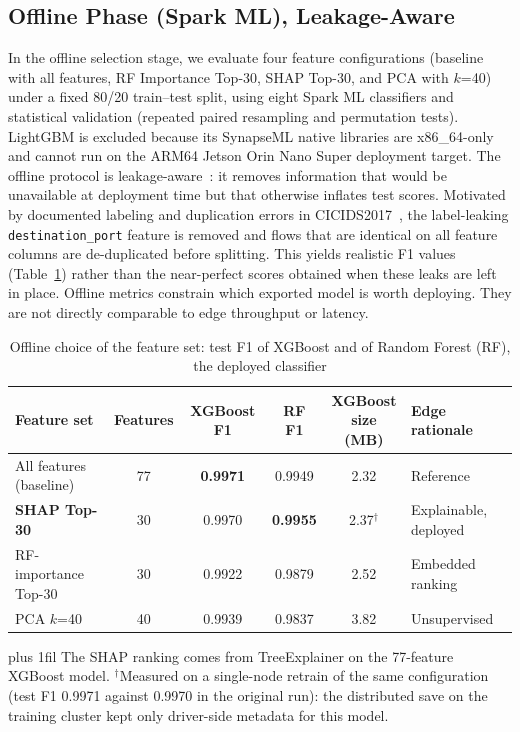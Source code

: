 \documentclass[runningheads]{llncs}
\newcommand{\tabnote}[1]{%
  \vspace{4pt}\par\noindent
  \begin{minipage}{\textwidth}%
    \footnotesize\parindent=0pt\leftskip=0pt\rightskip=0pt\parfillskip=0pt plus 1fil\relax
    #1%
  \end{minipage}}
\begin{document}
\subsection{Offline Phase (Spark ML), Leakage-Aware}

In the offline selection stage, we evaluate four feature configurations (baseline with all features, RF Importance Top-30, SHAP Top-30, and PCA with $k$=40) under a fixed 80/20 train--test split, using eight Spark ML classifiers and statistical validation (repeated paired resampling and permutation tests). LightGBM is excluded because its SynapseML native libraries are x86\_64-only and cannot run on the ARM64 Jetson Orin Nano Super deployment target. The offline protocol is leakage-aware~\cite{arp2022dosdonts}: it removes information that would be unavailable at deployment time but that otherwise inflates test scores. Motivated by documented labeling and duplication errors in CICIDS2017~\cite{lanvin2023errors}, the label-leaking \texttt{destination\_port} feature is removed and flows that are identical on all feature columns are de-duplicated before splitting. This yields realistic F1 values (Table~\ref{tab:spark-edge-bridge}) rather than the near-perfect scores obtained when these leaks are left in place. Offline metrics constrain which exported model is worth deploying. They are not directly comparable to edge throughput or latency.

\begin{table}[htbp]
  \caption{Offline choice of the feature set: test F1 of XGBoost and of Random Forest (RF), the deployed classifier}
  \label{tab:spark-edge-bridge}
  \centering
  \small
  \begin{tabular}{l c c c c l}
    \toprule
    Feature set & Features & XGBoost F1 & RF F1 & \shortstack{XGBoost\\size (MB)} & Edge rationale \\
    \midrule
    All features (baseline) & 77 & \textbf{0.9971} & 0.9949 & 2.32 & Reference \\
    \textbf{SHAP Top-30} & 30 & 0.9970 & \textbf{0.9955} & 2.37$^{\dagger}$ & Explainable, deployed \\
    RF-importance Top-30 & 30 & 0.9922 & 0.9879 & 2.52 & Embedded ranking \\
    PCA $k$=40 & 40 & 0.9939 & 0.9837 & 3.82 & Unsupervised \\
    \bottomrule
  \end{tabular}

  \tabnote{The SHAP ranking comes from TreeExplainer on the 77-feature XGBoost model. $^{\dagger}$Measured on a single-node retrain of the same configuration (test F1 0.9971 against 0.9970 in the original run): the distributed save on the training cluster kept only driver-side metadata for this model.}
\end{table}
\end{document}
